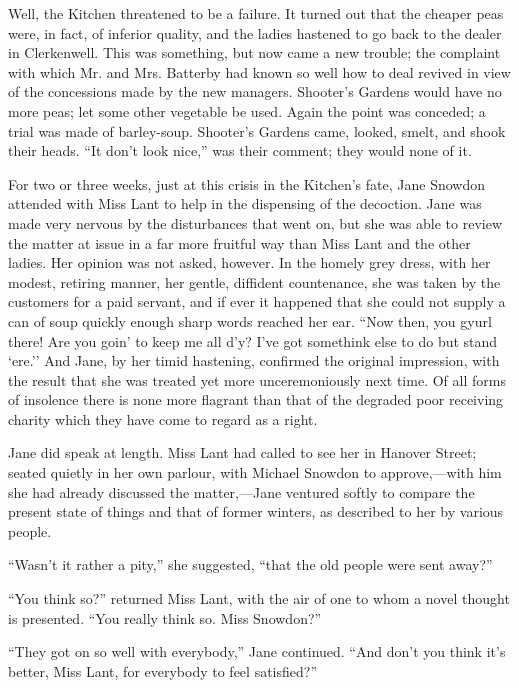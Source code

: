 {\protect\hypertarget{12}{}{}}Well, the Kitchen threatened to be a
failure. It turned out that the cheaper peas were, in fact, of inferior
quality, and the ladies hastened to go back to the dealer in
Clerkenwell. This was something, but now came a new trouble; the
complaint with which Mr. and Mrs. Batterby had known so well how to deal
revived in view of the concessions made by the new managers. Shooter's
Gardens would have no more peas; let some other vegetable be used. Again
the point was conceded; a trial was made of barley-soup. Shooter's
Gardens came, looked, smelt, and shook their heads. ``It don't look
nice,'' was their comment; they would none of it.

For two or three weeks, just at this crisis in the Kitchen's fate, Jane
Snowdon attended with Miss Lant to help in the dispensing of the
decoction. Jane was made very nervous by the disturbances that went on,
but she was able to review the matter at issue in a far more fruitful
way than Miss Lant and the other ladies. Her opinion was not asked,
however. In the homely grey dress, with her modest, retiring manner, her
gentle, diffident countenance, she was taken by the customers for a
{\protect\hypertarget{13}{}{}}paid servant, and if ever it happened that
she could not supply a can of soup quickly enough sharp words reached
her ear. ``Now then, you gyurl there! Are you goin' to keep me all d'y?
I've got somethink else to do but stand `ere.'' And Jane, by her timid
hastening, confirmed the original impression, with the result that she
was treated yet more unceremoniously next time. Of all forms of
insolence there is none more flagrant than that of the degraded poor
receiving charity which they have come to regard as a right.

Jane did speak at length. Miss Lant had called to see her in Hanover
Street; seated quietly in her own parlour, with Michael Snowdon to
approve,---with him she had already discussed the matter,---Jane
ventured softly to compare the present state of things and that of
former winters, as described to her by various people.

``Wasn't it rather a pity,'' she suggested, ``that the old people were
sent away?''

``You think so?'' returned Miss Lant, with the air of one to whom a
novel thought is presented. ``You really think so. Miss Snowdon?''

``They got on so well with everybody,''
{\protect\hypertarget{14}{}{}}Jane continued. ``And don't you think it's
better, Miss Lant, for everybody to feel satisfied?''

